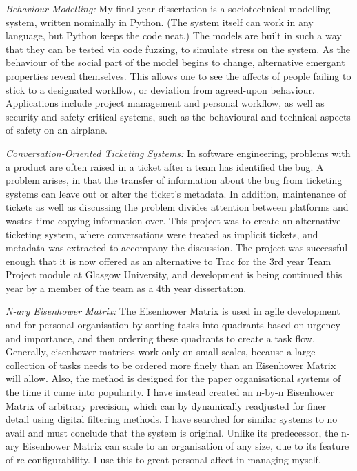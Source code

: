 \documentclass[margin, 10pt]{res}
\begin{document}
\begin{resume}
{\sl Behaviour Modelling:} My final year dissertation is a sociotechnical modelling system, written nominally in Python. (The system itself can work in any language, but Python keeps the code neat.) The models are built in such a way that they can be tested via code fuzzing, to simulate stress on the system. As the behaviour of the social part of the model begins to change, alternative emergant properties reveal themselves. This allows one to see the affects of people failing to stick to a designated workflow, or deviation from agreed-upon behaviour. Applications include project management and personal workflow, as well as security and safety-critical systems, such as the behavioural and technical aspects of safety on an airplane.

{\sl Conversation-Oriented Ticketing Systems:} In software engineering, problems with a product are often raised in a ticket after a team has identified the bug. A problem arises, in that the transfer of information about the bug from ticketing systems can leave out or alter the ticket's metadata. In addition, maintenance of tickets as well as discussing the problem divides attention between platforms and wastes time copying information over. This project was to create an alternative ticketing system, where conversations were treated as implicit tickets, and metadata was extracted to accompany the discussion. The project was successful enough that it is now offered as an alternative to Trac for the 3rd year Team Project module at Glasgow University, and development is being continued this year by a member of the team as a 4th year dissertation. 

{\sl N-ary Eisenhower Matrix:} The Eisenhower Matrix is used in agile development and for personal organisation by sorting tasks into quadrants based on urgency and importance, and then ordering these quadrants to create a task flow. Generally, eisenhower matrices work only on small scales, because a large collection of tasks needs to be ordered more finely than an Eisenhower Matrix will allow. Also, the method is designed for the paper organisational systems of the time it came into popularity. I have instead created an n-by-n Eisenhower Matrix of arbitrary precision, which can by dynamically readjusted for finer detail using digital filtering methods. I have searched for similar systems to no avail and must conclude that the system is original. Unlike its predecessor, the n-ary Eisenhower Matrix can scale to an organisation of any size, due to its feature of re-configurability. I use this to great personal affect in managing myself. 


\end{resume}
\end{document}

